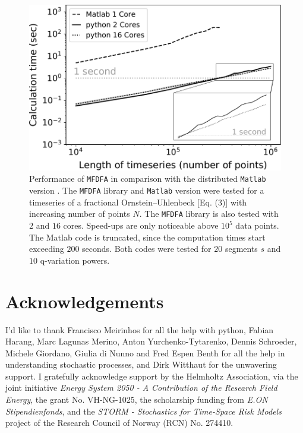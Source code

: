 \documentclass[pre, a4paper, aps, floatfix, superscriptaddress, onecolumn, notitlepage, longbibliography]{revtex4-1} %
\begin{document}
\begin{figure}[h]
  \includegraphics[width = 0.5\linewidth]{fig3.pdf}
  \caption{Performance of \texttt{MFDFA} in comparison with the distributed \texttt{Matlab} version \cite{Ihlen2012}.
  The \texttt{MFDFA} library and \texttt{Matlab} version were tested for a timeseries of a fractional Ornstein--Uhlenbeck [Eq. (3)] with increasing number of points $N$.
  The \texttt{MFDFA} library is also tested with $2$ and $16$ cores.
  Speed-ups are only noticeable above $10^5$ data points.
  The Matlab code is truncated, since the computation times start exceeding $200$ seconds.
  Both codes were tested for $20$ segments $s$ and $10$ q-variation powers.}
\end{figure}


\section*{Acknowledgements}
I'd like to thank Francisco Meirinhos for all the help with python, Fabian Harang, Marc Lagunas Merino, Anton Yurchenko-Tytarenko, Dennis Schroeder, Michele Giordano, Giulia di Nunno and Fred Espen Benth for all the help in understanding stochastic processes, and Dirk Witthaut for the unwavering support.
I gratefully acknowledge support by the Helmholtz Association, via the joint initiative \textit{Energy System 2050 - A Contribution of the Research Field Energy}, the grant No. VH-NG-1025, the scholarship funding from \textit{E.ON Stipendienfonds}, and the \textit{STORM - Stochastics for Time-Space Risk Models} project of the Research Council of Norway (RCN) No. 274410.


\end{document}
